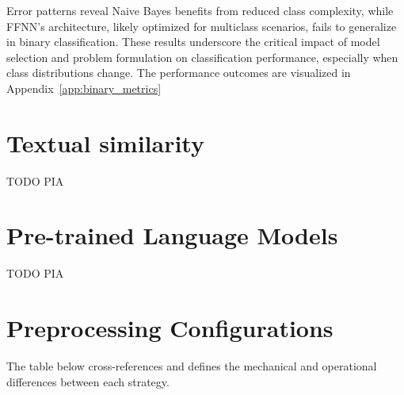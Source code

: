 \documentclass[manuscript,screen,review, nonacm]{acmart}
\begin{document}
Error patterns reveal Naive Bayes benefits from reduced class complexity, while FFNN's architecture, likely optimized for multiclass scenarios, fails to generalize in binary classification. These results underscore the critical impact of model selection and problem formulation on classification performance, especially when class distributions change.  The performance outcomes are visualized in Appendix~\ref{app:binary_metrics}

\section{Textual similarity}
TODO PIA

\section{Pre-trained Language Models}
TODO PIA

% 
% 

\appendix

\section{Preprocessing Configurations}
\label{app:preprocessing_configurations}

The table below cross-references and defines the mechanical and operational differences between each strategy.
\end{document}
